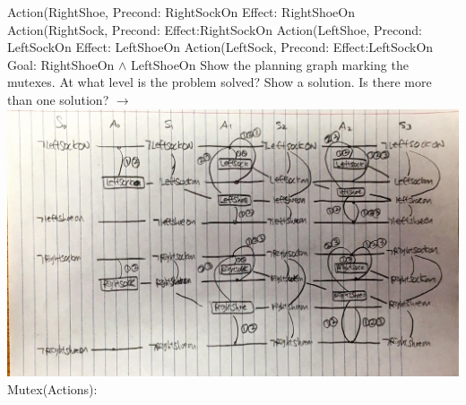 \documentclass[10pt]{article}
\begin{document}
\begin{enumerate}
\newline
Action(RightShoe, \newline
\hspace*{1.0cm} Precond: RightSockOn \newline
\hspace*{1.0cm} Effect: RightShoeOn \newline
Action(RightSock, \newline
\hspace*{1.0cm} Precond: \newline
\hspace*{1.0cm} Effect:RightSockOn \newline
Action(LeftShoe, \newline
\hspace*{1.0cm} Precond: LeftSockOn \newline
\hspace*{1.0cm} Effect: LeftShoeOn \newline
Action(LeftSock, \newline
\hspace*{1.0cm} Precond: \newline
\hspace*{1.0cm} Effect:LeftSockOn  \newline
  \newline
  Goal: RightShoeOn $\wedge$ LeftShoeOn \newline
  \newline
  Show the planning graph marking the mutexes. At what level is the problem solved? Show a solution. Is there more than one solution? \newline
$\rightarrow$ \newline
\includegraphics[width=\textwidth]{Q3.jpg}
\newline
Mutex(Actions): \newline

\end{enumerate}
\end{document}
